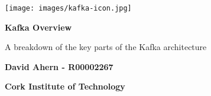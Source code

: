 \begin{titlepage}
    \begin{center}
    	\texttt{[image: images/kafka-icon.jpg]}
    	
        \vspace*{1cm}
        
        \textbf{Kafka Overview}
        
        \vspace{0.5cm}
        A breakdown of the key parts of the Kafka architecture
        
        \vspace{1.5cm}
        
        \textbf{David Ahern - R00002267}
        
        \vspace{0.5cm}
        \textbf{Cork Institute of Technology}
        
    \end{center}
\end{titlepage}